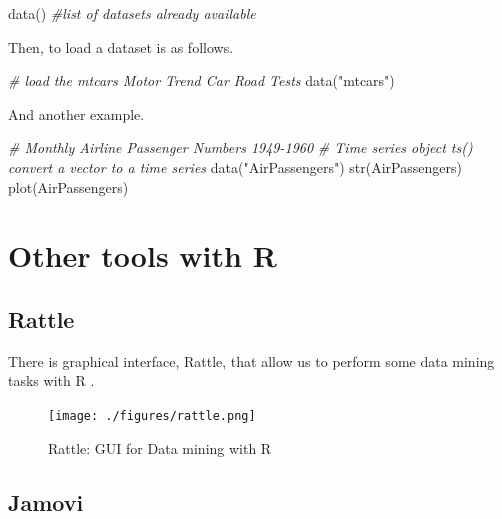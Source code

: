 \documentclass[
]{book}
\newenvironment{Shaded}{\begin{snugshade}}{\end{snugshade}}
\newcommand{\CommentTok}[1]{\textcolor[rgb]{0.56,0.35,0.01}{\textit{#1}}}
\newcommand{\FunctionTok}[1]{\textcolor[rgb]{0.00,0.00,0.00}{#1}}
\newcommand{\NormalTok}[1]{#1}
\newcommand{\StringTok}[1]{\textcolor[rgb]{0.31,0.60,0.02}{#1}}
\begin{document}
\begin{Shaded}
\begin{Highlighting}[]
\FunctionTok{data}\NormalTok{()  }\CommentTok{\#list of datasets already available}
\end{Highlighting}
\end{Shaded}

Then, to load a dataset is as follows.

\begin{Shaded}
\begin{Highlighting}[]
\CommentTok{\# load the mtcars  Motor Trend Car Road Tests}
\FunctionTok{data}\NormalTok{(}\StringTok{"mtcars"}\NormalTok{)}
\end{Highlighting}
\end{Shaded}

And another example.

\begin{Shaded}
\begin{Highlighting}[]
\CommentTok{\# Monthly Airline Passenger Numbers 1949{-}1960}
\CommentTok{\# Time series object ts() convert a vector to a time series}
\FunctionTok{data}\NormalTok{(}\StringTok{"AirPassengers"}\NormalTok{)}
\FunctionTok{str}\NormalTok{(AirPassengers)}
\FunctionTok{plot}\NormalTok{(AirPassengers)}
\end{Highlighting}
\end{Shaded}

\hypertarget{other-tools-with-r}{%
\section{Other tools with R}\label{other-tools-with-r}}

\hypertarget{rattle}{%
\subsection{Rattle}\label{rattle}}

There is graphical interface, Rattle, that allow us to perform some data mining tasks with R \citep{Williams11}.

\begin{figure}
\centering
\texttt{[image: ./figures/rattle.png]}
\caption{Rattle: GUI for Data mining with R}
\end{figure}

\hypertarget{jamovi}{%
\subsection{Jamovi}\label{jamovi}}
\end{document}
